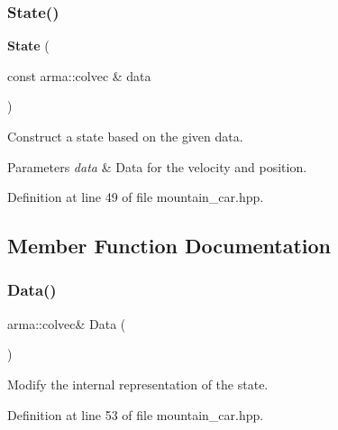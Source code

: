 \subsubsection{State()\hspace{0.1cm}{\footnotesize\ttfamily [2/2]}}
{\footnotesize\ttfamily \textbf{ State} (\begin{DoxyParamCaption}\item[{const arma\+::colvec \&}]{data }\end{DoxyParamCaption})\hspace{0.3cm}{\ttfamily [inline]}}



Construct a state based on the given data. 


\begin{DoxyParams}{Parameters}
{\em data} & Data for the velocity and position. \\
\hline
\end{DoxyParams}


Definition at line 49 of file mountain\+\_\+car.\+hpp.



\subsection{Member Function Documentation}
\mbox{\label{classmlpack_1_1rl_1_1MountainCar_1_1State_ad6a50c7b5fced2e931d9a4b4ff989ed6}} 
\subsubsection{Data()}
{\footnotesize\ttfamily arma\+::colvec\& Data (\begin{DoxyParamCaption}{ }\end{DoxyParamCaption})\hspace{0.3cm}{\ttfamily [inline]}}



Modify the internal representation of the state. 



Definition at line 53 of file mountain\+\_\+car.\+hpp.

\mbox{\label{classmlpack_1_1rl_1_1MountainCar_1_1State_a8c1a320788b55fad936455caf0acb62a}} 
